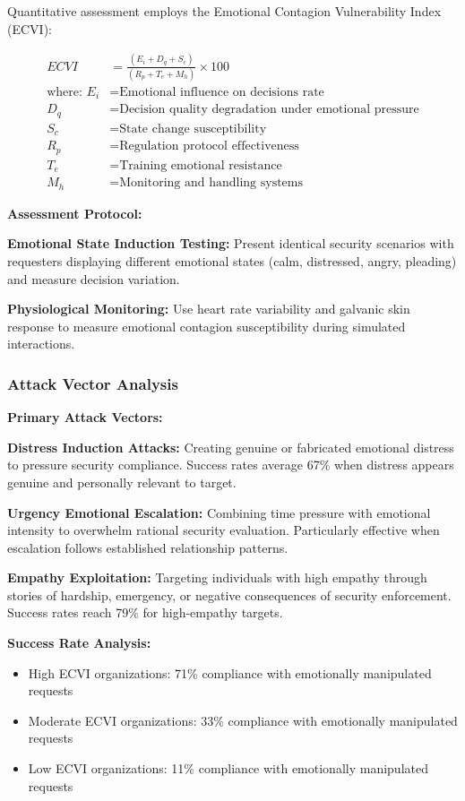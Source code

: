 \documentclass[11pt,a4paper]{article}
\begin{document}
Quantitative assessment employs the Emotional Contagion Vulnerability Index (ECVI):

\begin{align}
ECVI &= \frac{(E_i + D_q + S_c)}{(R_p + T_e + M_h)} \times 100 \\
\text{where: } E_i &= \text{Emotional influence on decisions rate} \\
D_q &= \text{Decision quality degradation under emotional pressure} \\
S_c &= \text{State change susceptibility} \\
R_p &= \text{Regulation protocol effectiveness} \\
T_e &= \text{Training emotional resistance} \\
M_h &= \text{Monitoring and handling systems}
\end{align}

\textbf{Assessment Protocol:}

\textbf{Emotional State Induction Testing:} Present identical security scenarios with requesters displaying different emotional states (calm, distressed, angry, pleading) and measure decision variation.

\textbf{Physiological Monitoring:} Use heart rate variability and galvanic skin response to measure emotional contagion susceptibility during simulated interactions.

\subsubsection{Attack Vector Analysis}

\textbf{Primary Attack Vectors:}

\textbf{Distress Induction Attacks:} Creating genuine or fabricated emotional distress to pressure security compliance. Success rates average 67\% when distress appears genuine and personally relevant to target.

\textbf{Urgency Emotional Escalation:} Combining time pressure with emotional intensity to overwhelm rational security evaluation. Particularly effective when escalation follows established relationship patterns.

\textbf{Empathy Exploitation:} Targeting individuals with high empathy through stories of hardship, emergency, or negative consequences of security enforcement. Success rates reach 79\% for high-empathy targets.

\textbf{Success Rate Analysis:}
\begin{itemize}
\item High ECVI organizations: 71\% compliance with emotionally manipulated requests
\item Moderate ECVI organizations: 33\% compliance with emotionally manipulated requests
\item Low ECVI organizations: 11\% compliance with emotionally manipulated requests
\end{itemize}
\end{document}
